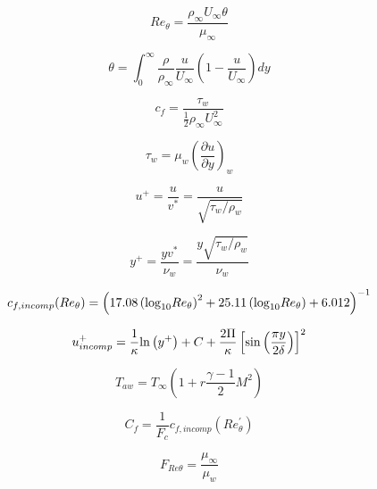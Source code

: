 

\begin{equation}
Re_{\theta} = \frac{\rho_{\infty} U_{\infty} \theta}{\mu_{\infty}}
\end{equation}

\begin{equation}
\theta = \int_0^{\infty} \frac{\rho}{\rho_{\infty}} \frac{u}{U_{\infty}} \left( 1 - \frac{u}{U_{\infty}} \right) dy
\end{equation}

\begin{equation}
c_f = \frac{\tau_w}{\frac{1}{2} \rho_{\infty} U_{\infty}^2}
\end{equation}

\begin{equation}
\tau_w = \mu_w \left( \frac{\partial u}{\partial y} \right)_w
\end{equation}

\begin{equation}
u^+ = \frac{u}{v^*} = \frac{u}{\sqrt{\tau_w / \rho_w}}
\end{equation}

\begin{equation}
y^+ = \frac{y v^*}{\nu_w} = \frac{y \sqrt{\tau_w / \rho_w}}{\nu_w}
\end{equation}

\begin{equation}
c_{f,incomp}(Re_{\theta}) = \left( 17.08 \left({\rm log}_{10}Re_{\theta} \right)^2 + 25.11 \left( {\rm log}_{10}Re_{\theta} \right) +
   6.012 \right)^{-1}
\end{equation}

\begin{equation}
u^+_{incomp} = \frac{1}{\kappa} {\rm ln} \left( y^+ \right) + C + \frac{2 \Pi}{\kappa}
\left[ {\rm sin} \left( \frac{\pi y}{2 \delta} \right) \right]^2
\end{equation}

\begin{equation}
T_{aw}=T_{\infty}\left(1+r\frac{\gamma-1}{2}M^2 \right)
\end{equation}

\begin{equation}
C_f = \frac{1}{F_c} {c_{f,incomp}} \left(Re_{\theta}^{'}\right)
\end{equation}

\begin{equation}
F_{Re\theta}=\frac{\mu_\infty}{\mu_w}
\end{equation}

